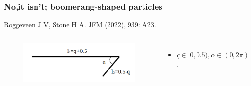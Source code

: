 \documentclass{beamer}
\newcommand{\bi}{\begin{itemize}}
\newcommand{\ei}{\end{itemize}}
\begin{document}
\begin{frame}
	\frametitle{No,it isn't; boomerang-shaped particles}
	\begin{overlayarea}{\textwidth}{\textheight}
		\vspace{-0.5cm}
		\footnotesize Roggeveen J V, Stone H A. JFM (2022), 939: A23.\vspace{-0.2cm}
		\begin{columns}
		\vspace{0.5cm}
		\begin{figure}[htb]
			\begin{center}
				\includegraphics[width=1\textwidth]{plots/geometry2.png}
			\end{center}
		\end{figure}
		\vspace{-1.7cm}
		\small
		\bi
		\item $q \in [0,0.5), \alpha \in (0,2\pi)$.
		\ei
		\end{columns}
	\end{overlayarea}
\end{frame}

\end{document}
